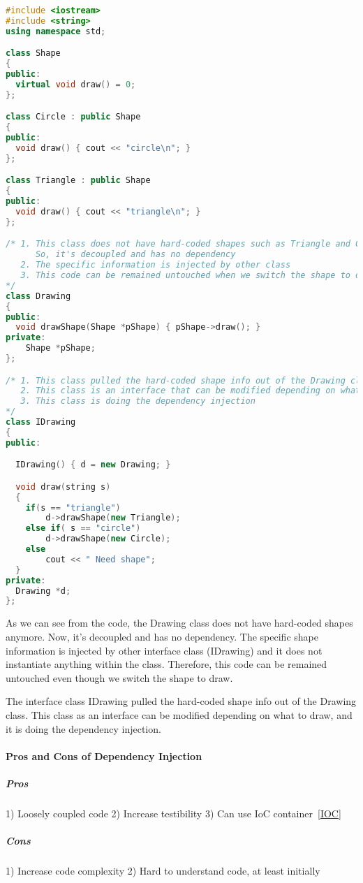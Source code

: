 \documentclass{book}
\begin{document}
\begin{lstlisting}[caption={Dependency Injection example code}, language=C++]
#include <iostream>
#include <string>
using namespace std;

class Shape
{
public:
  virtual void draw() = 0;
};

class Circle : public Shape
{
public:
  void draw() { cout << "circle\n"; }
};

class Triangle : public Shape
{
public:
  void draw() { cout << "triangle\n"; }
};

/* 1. This class does not have hard-coded shapes such as Triangle and Circle
      So, it's decoupled and has no dependency
   2. The specific information is injected by other class
   3. This code can be remained untouched when we switch the shape to draw  
*/
class Drawing
{
public:
  void drawShape(Shape *pShape) { pShape->draw(); }
private:
    Shape *pShape;
};

/* 1. This class pulled the hard-coded shape info out of the Drawing class (compare with the previous example)
   2. This class is an interface that can be modified depending on what to draw
   3. This class is doing the dependency injection
*/
class IDrawing
{
public:

  IDrawing() { d = new Drawing; }

  void draw(string s)
  {
    if(s == "triangle")
        d->drawShape(new Triangle);
    else if( s == "circle")
        d->drawShape(new Circle);
    else
        cout << " Need shape";
  }
private:
  Drawing *d;
};
\end{lstlisting}
As we can see from the code, the Drawing class does not have hard-coded shapes anymore. Now, it's decoupled and has no dependency. 
The specific shape information is injected by other interface class (IDrawing) and it does not instantiate anything within the class.
Therefore, this code can be remained untouched even though we switch the shape to draw.

The interface class IDrawing pulled the hard-coded shape info out of the Drawing class. This class as an interface can be modified depending on what to draw, and it is doing the dependency injection.

\paragraph{Pros and Cons of Dependency Injection}

\subparagraph{Pros}
1)      Loosely coupled code
2)     Increase testibility
3)    Can use IoC container~\ref{IOC}
 \subparagraph{Cons}
1)        Increase code complexity
 2)       Hard to understand code, at least initially
\end{document}
